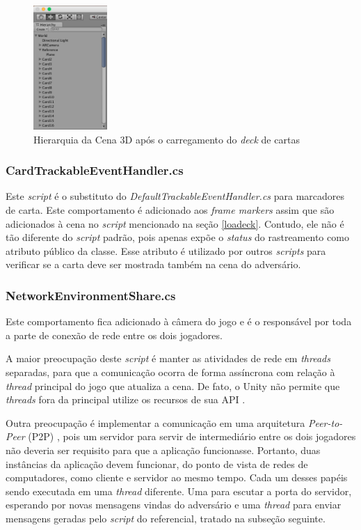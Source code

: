 \documentclass[conference]{IEEEtran}
\begin{document}
\begin{figure}[t]
	\caption{Hierarquia da Cena 3D após o carregamento do \textit{deck}
		 de cartas}
	\label{cardsld}
	\centering
	\includegraphics[width=0.25\textwidth]{hierarchyloaded}
\end{figure}

\subsubsection{CardTrackableEventHandler.cs}
\label{cardtracker}
Este \textit{script} é o substituto do \textit{DefaultTrackableEventHandler.cs} 
para marcadores de carta. Este comportamento é adicionado aos 
\textit{frame markers} assim que são adicionados à cena no \textit{script} 
mencionado na seção \ref{loadeck}. Contudo, ele não é tão diferente do 
\textit{script} padrão, pois apenas expõe o \textit{status} do rastreamento 
como atributo público da classe. Esse atributo é utilizado por outros 
\textit{scripts} para verificar se a carta deve ser mostrada também na cena do 
adversário.

\subsubsection{NetworkEnvironmentShare.cs}
\label{networkenv}
Este comportamento fica adicionado à câmera do jogo e é o responsável por toda 
a parte de conexão de rede entre os dois jogadores.

A maior preocupação deste \textit{script} é manter as atividades de rede em 
\textit{threads} separadas, para que a comunicação ocorra de forma assíncrona 
com relação à \textit{thread} principal do jogo que atualiza a cena. De fato, o 
Unity não permite que \textit{threads} fora da principal utilize os recursos de 
sua API \cite{multithreading}.

Outra preocupação é implementar a comunicação em uma arquitetura \textit{
Peer-to-Peer} (P2P) \cite{p2p}, pois um servidor para servir de intermediário 
entre os dois jogadores não deveria ser requisito para que a aplicação 
funcionasse. Portanto, duas instâncias da aplicação devem funcionar, do ponto de 
vista de redes de computadores, como cliente e servidor ao mesmo tempo. Cada um 
desses papéis sendo executada em uma \textit{thread} diferente. Uma para escutar 
a porta do servidor, esperando por novas mensagens vindas do adversário e uma 
\textit{thread} para enviar mensagens geradas pelo \textit{script} do 
referencial, tratado na subseção seguinte.
\end{document}
